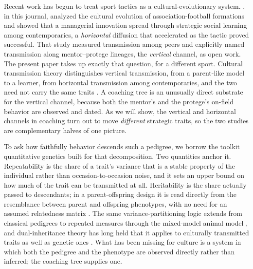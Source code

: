 \documentclass[11pt]{article}
\begin{document}
Recent work has begun to treat sport tactics as a cultural-evolutionary system.
\citet{mesoudi2020}, in this journal, analyzed the cultural evolution of
association-football formations and showed that a managerial innovation spread
through strategic social learning among contemporaries, a \emph{horizontal}
diffusion that accelerated as the tactic proved successful. That study measured
transmission among peers and explicitly named transmission along mentor--protege
lineages, the \emph{vertical} channel, as open work. The present paper takes up
exactly that question, for a different sport. Cultural transmission theory
distinguishes vertical transmission, from a parent-like model to a learner, from
horizontal transmission among contemporaries, and the two need not carry the same
traits \citep{cavallisforza1981, boydricherson1985}. A coaching tree is an
unusually direct substrate for the vertical channel, because both the mentor's and
the protege's on-field behavior are observed and dated. As we will show, the
vertical and horizontal channels in coaching turn out to move \emph{different}
strategic traits, so the two studies are complementary halves of one picture.

To ask how faithfully behavior descends such a pedigree, we borrow the toolkit
quantitative genetics built for that decomposition. Two quantities anchor it.
Repeatability is the share of a trait's variance that is a stable property of the
individual rather than occasion-to-occasion noise, and it sets an upper bound on how
much of the trait can be transmitted at all. Heritability is the share actually
passed to descendants; in a parent-offspring design it is read directly from the
resemblance between parent and offspring phenotypes, with no need for an assumed
relatedness matrix \citep{falconermackay1996}. The same variance-partitioning logic
extends from classical pedigrees to repeated measures through the mixed-model animal
model \citep{wilson2010, nakagawa2010}, and dual-inheritance theory has long held
that it applies to culturally transmitted traits as well as genetic ones
\citep{cavallisforza1981}. What has been missing for culture is a system in which
both the pedigree and the phenotype are observed directly rather than inferred; the
coaching tree supplies one.
\end{document}
